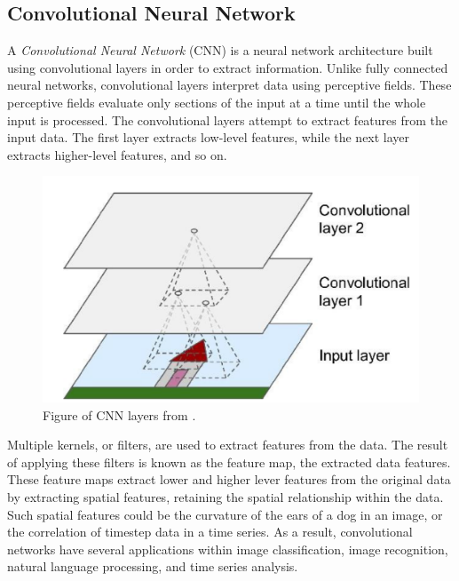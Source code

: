 \subsection{Convolutional Neural Network}
A \textit{Convolutional Neural Network} (CNN) is a neural network architecture built using convolutional layers in order to extract information.
Unlike fully connected neural networks, convolutional layers interpret data using perceptive fields.
These perceptive fields evaluate only sections of the input at a time until the whole input is processed.
The convolutional layers attempt to extract features from the input data.
The first layer extracts low-level features, while the next layer extracts higher-level features, and so on.

\cite[p.~443-446]{Geron2017}


\begin{figure}[h!]
    \centering
    \includegraphics[width=\textwidth]{./sections/BT/figures/convolution_hands_one_machine_learning.png}
    \hfill
    \caption{Figure of CNN layers from \cite[p.~444]{Geron2017}.}
    \label{fig:convolution}
\end{figure}


Multiple kernels, or filters, are used to extract features from the data.
The result of applying these filters is known as the feature map, the extracted data features.
These feature maps extract lower and higher lever features from the original data by
extracting spatial features, retaining the spatial relationship within the data.
Such spatial features could be the curvature of the ears of a dog in an image, or the correlation of timestep data in a time series.
As a result, convolutional networks have several applications within image classification,
image recognition, natural language processing, and time series analysis.

